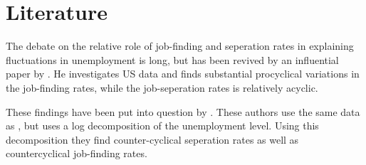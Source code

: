\section{Literature}

The debate on the relative role of job-finding and seperation rates in explaining fluctuations in unemployment is long, but has been revived by an influential paper by \cite{Shimer}. He investigates US data and finds substantial procyclical variations in the job-finding rates, while the job-seperation rates is relatively acyclic. 

These findings have been put into question by \cite{Elsby et al}. These authors use the same data as \cite{Shimer}, but uses a log decomposition of the unemployment level. Using this decomposition they find counter-cyclical seperation rates as well as countercyclical job-finding rates. 